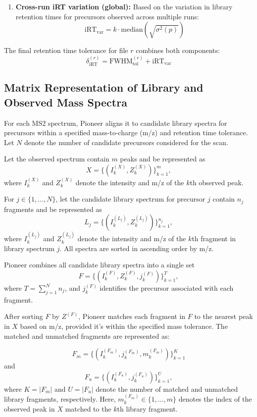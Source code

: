\documentclass[pdflatex,sn-nature]{sn-jnl}
\begin{document}
\begin{enumerate}
{\begin{enumerate}
    \item \textbf{Cross-run iRT variation (global):} Based on the variation in library retention times for precursors observed across multiple runs:
    \begin{equation}
        \text{iRT}_{\text{var}} = k \cdot \text{median} \left(\sqrt{\sigma^2(p)}\right)
        \label{eq:irt_var}
    \end{equation}
\end{enumerate}
The final retention time tolerance for file $r$ combines both components:
\begin{equation}
    \delta_{\text{iRT}}^{(r)} = \text{FWHM}_{\text{tol}}^{(r)} + \text{iRT}_{\text{var}}
\end{equation}
}
\end{enumerate}


\subsection{Matrix Representation of Library and Observed Mass Spectra}\label{subsec:matrix-representation}

For each MS2 spectrum, Pioneer aligns it to candidate library spectra for precursors within a specified mass-to-charge (m/z) and retention time tolerance. Let $N$ denote the number of candidate precursors considered for the scan.

Let the observed spectrum contain $m$ peaks and be represented as
\[
X = \{(I_k^{(X)}, Z_k^{(X)})\}_{k=1}^{m},
\]
where $I_k^{(X)}$ and $Z_k^{(X)}$ denote the intensity and m/z of the $k$th observed peak.

For $j \in \{1,\ldots,N\}$, let the candidate library spectrum for precursor $j$ contain $n_j$ fragments and be represented as
\[
L_j = \{(I_k^{(L_j)}, Z_k^{(L_j)})\}_{k=1}^{n_j},
\]
where $I_k^{(L_j)}$ and $Z_k^{(L_j)}$ denote the intensity and m/z of the $k$th fragment in library spectrum $j$. All spectra are sorted in ascending order by m/z.

Pioneer combines all candidate library spectra into a single set
\[
F = \{(I_k^{(F)}, Z_k^{(F)}, j_k^{(F)})\}_{k=1}^{T},
\]
where $T = \sum_{j=1}^{N} n_j$, and $j_k^{(F)}$ identifies the precursor associated with each fragment.

After sorting $F$ by $Z^{(F)}$, Pioneer matches each fragment in $F$ to the nearest peak in $X$ based on m/z, provided it's within the specified mass tolerance. The matched and unmatched fragments are represented as:

\[
F_m = \{(I_k^{(F_m)}, j_k^{(F_m)}, m_k^{(F_m)})\}_{k=1}^{K}
\]
and
\[
F_u = \{(I_k^{(F_u)}, j_k^{(F_u)})\}_{k=1}^{U},
\]
where $K = |F_m|$ and $U = |F_u|$ denote the number of matched and unmatched library fragments, respectively. Here, $m_k^{(F_m)} \in \{1,\ldots,m\}$ denotes the index of the observed peak in $X$ matched to the $k$th library fragment.
\end{document}

